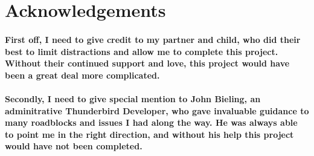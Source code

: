 \newpage

\section{Acknowledgements}

\paragraph{First off, I need to give credit to my partner and child, who did their best to limit distractions and allow me to complete this project. Without their continued support and love, this project would have been a great deal more complicated.}

\paragraph{Secondly, I need to give special mention to John Bieling, an adminitrative Thunderbird Developer, who gave invaluable guidance to many roadblocks and issues I had along the way. He was always able to point me in the right direction, and without his help this project would have not been completed.}